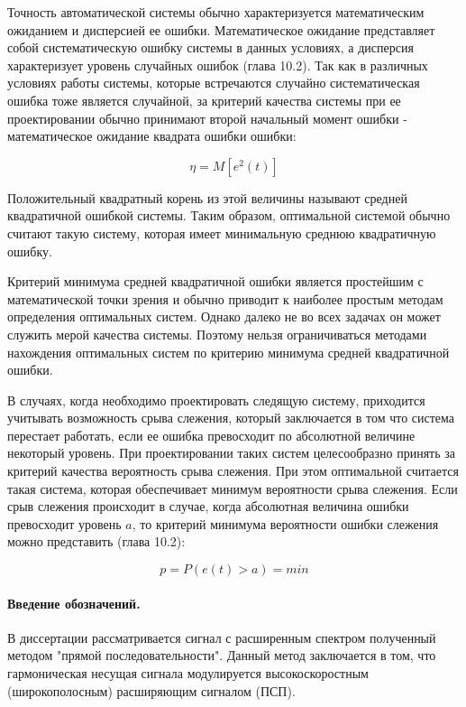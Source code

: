 Точность автоматической системы обычно характеризуется математическим ожиданием и дисперсией ее ошибки.
Математическое ожидание представляет собой систематическую ошибку системы в данных условиях, а дисперсия
характеризует уровень случайных ошибок \cite{pugachev} (глава 10.2). Так как в различных условиях работы
системы, которые встречаются случайно систематическая ошибка тоже является случайной, за критерий качества
системы при ее проектировании обычно принимают второй начальный момент ошибки - математическое ожидание
квадрата ошибки ошибки:
\begin{center}
\begin{equation}
	\label{eq:stat_err_prob}
	\eta = M[e^2(t)]
\end{equation}
\end{center}
Положительный квадратный корень из этой величины называют средней квадратичной ошибкой системы. Таким образом,
оптимальной системой обычно считают такую систему, которая имеет минимальную среднюю квадратичную ошибку.

Критерий минимума средней квадратичной ошибки является простейшим с математической точки зрения и обычно приводит
к наиболее простым методам определения оптимальных систем. Однако далеко не во всех задачах он может служить мерой
качества системы. Поэтому нельзя ограничиваться методами нахождения оптимальных систем по критерию минимума средней
квадратичной ошибки.

В случаях, когда необходимо проектировать следящую систему, приходится учитывать возможность срыва слежения,
который заключается в том что система перестает работать, если ее ошибка превосходит по абсолютной величине некоторый
уровень. При проектировании таких систем целесообразно принять за критерий качества вероятность срыва слежения. При
этом оптимальной считается такая система, которая обеспечивает минимум вероятности срыва слежения. Если срыв слежения
происходит в случае, когда абсолютная величина ошибки превосходит уровень $a$, то критерий минимума вероятности ошибки
слежения можно представить \cite{pugachev} (глава 10.2):
\begin{center}
\begin{equation}
	\label{eq:prob_lost_signal}
	p = P(e(t) > a) = min
\end{equation}
\end{center}

\paragraph{Введение обозначений.}
В диссертации рассматривается сигнал с расширенным спектром полученный методом "прямой последовательности".
Данный метод заключается в том, что гармоническая несущая сигнала модулируется высокоскоростным (широкополосным)
расширяющим сигналом (ПСП). 


